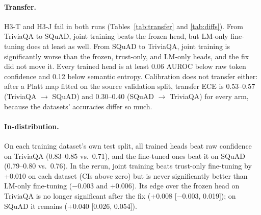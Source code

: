 \documentclass[11pt]{article}
\begin{document}
\paragraph{Transfer.} H3-T and H3-J fail in both runs (Tables~\ref{tab:transfer} and \ref{tab:diffs}). From TriviaQA to SQuAD, joint training beats the frozen head, but LM-only fine-tuning does at least as well. From SQuAD to TriviaQA, joint training is significantly worse than the frozen, trust-only, and LM-only heads, and the fix did not move it. Every trained head is at least 0.06 AUROC below raw token confidence and 0.12 below semantic entropy. Calibration does not transfer either: after a Platt map fitted on the source validation split, transfer ECE is 0.53--0.57 (TriviaQA $\to$ SQuAD) and 0.30--0.40 (SQuAD $\to$ TriviaQA) for every arm, because the datasets' accuracies differ so much.

\paragraph{In-distribution.} On each training dataset's own test split, all trained heads beat raw confidence on TriviaQA (0.83--0.85 vs.\ 0.71), and the fine-tuned ones beat it on SQuAD (0.79--0.80 vs.\ 0.76). In the rerun, joint training beats trust-only fine-tuning by +0.010 on each dataset (CIs above zero) but is never significantly better than LM-only fine-tuning ($-$0.003 and +0.006). Its edge over the frozen head on TriviaQA is no longer significant after the fix (+0.008 [$-$0.003, 0.019]); on SQuAD it remains (+0.040 [0.026, 0.054]).

\begin{table}[t]
\centering
\small
\setlength{\tabcolsep}{3.5pt}
\caption{Generation quality, first run / rerun: accuracy of regenerated answers (\%), perplexity rise (\%), and median words per answer on the training dataset's test set.}
\label{tab:gen}
\end{table}
\end{document}

